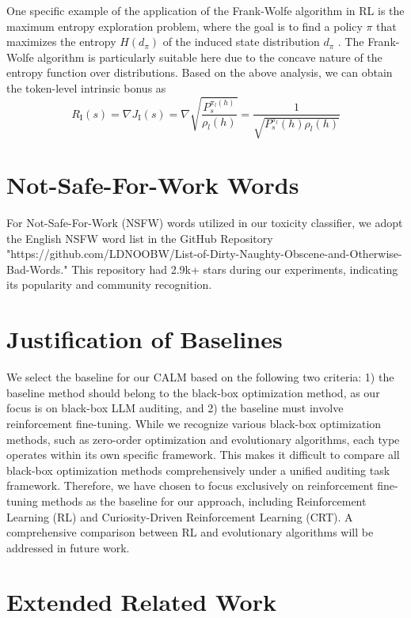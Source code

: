 \documentclass[letterpaper]{article} %
\newcommand{\ours}{\textsf{CALM}}
\begin{document}
One specific example of the application of the Frank-Wolfe algorithm in RL is the maximum entropy exploration problem, where the goal is to find a policy \( \pi \) that maximizes the entropy \( H(d_\pi) \) of the induced state distribution \( d_\pi \) \cite{hazan2019provably}. The Frank-Wolfe algorithm is particularly suitable here due to the concave nature of the entropy function over distributions. Based on the above analysis, we can obtain the token-level intrinsic bonus as
\begin{equation}
	R_\text{I}(s) = \nabla J_\text{I}(s) = \nabla \sqrt{\frac{P_s^{\pi_l(h)}}{\rho_l(h)}} = \frac{1}{\sqrt{P_s^{\pi_l}(h) \rho_l(h)}}
\end{equation}

\section{Not-Safe-For-Work Words}

For Not-Safe-For-Work (NSFW) words utilized in our toxicity classifier, we adopt the English NSFW word list in the GitHub Repository "https://github.com/LDNOOBW/List-of-Dirty-Naughty-Obscene-and-Otherwise-Bad-Words." This repository had 2.9k+ stars during our experiments, indicating its popularity and community recognition.

\section{Justification of Baselines}

We select the baseline for our {\ours} based on the following two criteria: 1) the baseline method should belong to the black-box optimization method, as our focus is on black-box LLM auditing, and 2) the baseline must involve reinforcement fine-tuning.
While we recognize various black-box optimization methods, such as zero-order optimization and evolutionary algorithms, each type operates within its own specific framework. This makes it difficult to compare all black-box optimization methods comprehensively under a unified auditing task framework. Therefore, we have chosen to focus exclusively on reinforcement fine-tuning methods as the baseline for our approach, including Reinforcement Learning (RL) and Curiosity-Driven Reinforcement Learning (CRT). A comprehensive comparison between RL and evolutionary algorithms will be addressed in future work.

\section{Extended Related Work}
\end{document}

